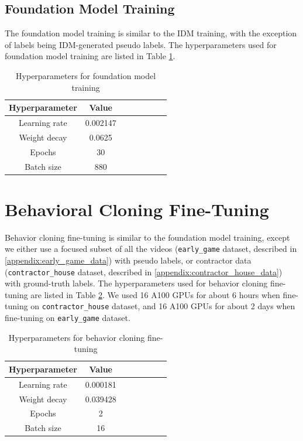 \subsection{Foundation Model Training}
The foundation model training is similar to the IDM training, with the exception of labels being IDM-generated pseudo labels. The hyperparameters used for foundation model training are listed in Table \ref{table:a_foundation_hps}.

\begin{table}[h]
\begin{center}
\begin{tabular}{ |c|c|p{0.55\linewidth}| }
\hline
 \textbf{Hyperparameter} & \textbf{Value} \\  
 \hline
 Learning rate & 0.002147 \\
 Weight decay & 0.0625 \\
 Epochs & 30 \\
 Batch size & 880 \\
 \hline
\end{tabular}
\end{center}
\caption{\label{table:a_foundation_hps}Hyperparameters for foundation model training}
\end{table}

\section{Behavioral Cloning Fine-Tuning}
Behavior cloning fine-tuning is similar to the foundation model training, except we either use a focused subset of all the videos (\texttt{early\_game} dataset, described in \ref{appendix:early_game_data}) with pseudo labels, or contractor data (\texttt{contractor\_house} dataset, described in \ref{appendix:contractor_house_data}) with ground-truth labels.
The hyperparameters used for behavior cloning fine-tuning are listed in Table \ref{table:a_bc_hps}. We used 16 A100 GPUs for about 6 hours when fine-tuning on \texttt{contractor\_house} dataset, and 16 A100 GPUs for about 2 days when fine-tuning on \texttt{early\_game} dataset. 

\begin{table}[h]
\begin{center}
\begin{tabular}{ |c|c|p{0.55\linewidth}| }
\hline
 \textbf{Hyperparameter} & \textbf{Value} \\  
 \hline
 Learning rate & 0.000181 \\
 Weight decay & 0.039428 \\
 Epochs & 2 \\
 Batch size & 16 \\
 \hline
\end{tabular}
\end{center}
\caption{\label{table:a_bc_hps}Hyperparameters for behavior cloning fine-tuning}
\end{table}